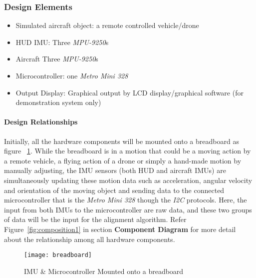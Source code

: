 		\subsubsection{Design Elements}
			\begin{itemize}
				\item Simulated aircraft object: a remote controlled vehicle/drone
				\item HUD IMU: Three \textit{MPU-9250}s
				\item Aircraft Three \textit{MPU-9250}s
				\item Microcontroller: one \textit{Metro Mini 328}
				\item Output Display: Graphical output by LCD display/graphical software (for demonstration system only)\\
			\end{itemize}

			\paragraph{Design Relationships}
			Initially, all the hardware components will be mounted onto a breadboard as figure ~\ref{fig:breadboard}. While the breadboard is in a motion that could be a moving action by a remote vehicle, a flying action of a drone or simply a hand-made motion by manually adjusting, the IMU sensors (both HUD and aircraft IMUs) are simultaneously updating these motion data such as acceleration, angular velocity and orientation of the moving object and sending data to the connected microcontroller that is the \textit{Metro Mini 328} though the \textit{I2C} protocols. Here, the input from both IMUs to the microcontroller are raw data, and these two groups of data will be the input for the alignment algorithm. Refer Figure~\ref{fig:composition1} in section \textbf{Component Diagram} for more detail about the relationship among all hardware components.\\

			\begin{figure}
				\centering
			 		\caption{IMU \& Microcontroller Mounted onto a breadboard}
			      	\texttt{[image: breadboard]}
			    \label{fig:breadboard}
			\end{figure}




